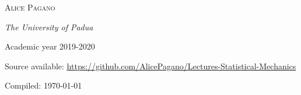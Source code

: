\begin{titlepage}
	{\scshape\Large Alice Pagano \\} %
	
	\vspace{0.5\baselineskip} %
	
	\textit{The University of Padua } %
	
	\vspace{0.5\baselineskip}
	
	\small Academic year 2019-2020
	
	\vspace{4cm}
	
	Source available: \url{https://github.com/AlicePagano/Lectures-Statistical-Mechanics}
	\vspace{2cm}
	
	\footnotesize Compiled: \today %
	
	\vfill %

\end{titlepage}

\clearpage{\pagestyle{empty}\cleardoublepage}
